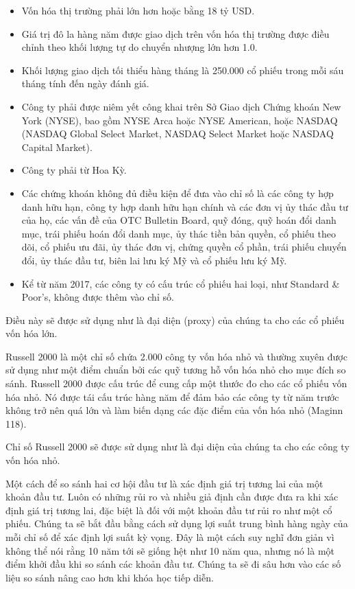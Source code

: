\begin{itemize}
  \item Vốn hóa thị trường phải lớn hơn hoặc bằng 18 tỷ USD.
  \item Giá trị đô la hàng năm được giao dịch trên vốn hóa thị trường được điều chỉnh theo khối lượng tự do chuyển nhượng lớn hơn 1.0.
  \item Khối lượng giao dịch tối thiểu hàng tháng là 250.000 cổ phiếu trong mỗi sáu tháng tính đến ngày đánh giá.
  \item Công ty phải được niêm yết công khai trên Sở Giao dịch Chứng khoán New York (NYSE), bao gồm NYSE Arca hoặc NYSE American, hoặc NASDAQ (NASDAQ Global Select Market, NASDAQ Select Market hoặc NASDAQ Capital Market).
  \item Công ty phải từ Hoa Kỳ.
  \item Các chứng khoán không đủ điều kiện để đưa vào chỉ số là các công ty hợp danh hữu hạn, công ty hợp danh hữu hạn chính và các đơn vị ủy thác đầu tư của họ, các vấn đề của OTC Bulletin Board, quỹ đóng, quỹ hoán đổi danh mục, trái phiếu hoán đổi danh mục, ủy thác tiền bản quyền, cổ phiếu theo dõi, cổ phiếu ưu đãi, ủy thác đơn vị, chứng quyền cổ phần, trái phiếu chuyển đổi, ủy thác đầu tư, biên lai lưu ký Mỹ và cổ phiếu lưu ký Mỹ.
  \item Kể từ năm 2017, các công ty có cấu trúc cổ phiếu hai loại, như Standard \& Poor's, không được thêm vào chỉ số.
\end{itemize}
Điều này sẽ được sử dụng như là đại diện (proxy) của chúng ta cho các cổ phiếu vốn hóa lớn.

Russell 2000 là một chỉ số chứa 2.000 công ty vốn hóa nhỏ và thường xuyên được sử dụng như một điểm chuẩn bởi các quỹ tương hỗ vốn hóa nhỏ cho mục đích so sánh. Russell 2000 được cấu trúc để cung cấp một thước đo cho các cổ phiếu vốn hóa nhỏ. Nó được tái cấu trúc hàng năm để đảm bảo các công ty từ năm trước không trở nên quá lớn và làm biến dạng các đặc điểm của vốn hóa nhỏ (Maginn 118).

Chỉ số Russell 2000 sẽ được sử dụng như là đại diện của chúng ta cho các công ty vốn hóa nhỏ.

Một cách để so sánh hai cơ hội đầu tư là xác định giá trị tương lai của một khoản đầu tư. Luôn có những rủi ro và nhiều giả định cần được đưa ra khi xác định giá trị tương lai, đặc biệt là đối với một khoản đầu tư rủi ro như một cổ phiếu. Chúng ta sẽ bắt đầu bằng cách sử dụng lợi suất trung bình hàng ngày của mỗi chỉ số để xác định lợi suất kỳ vọng. Đây là một cách suy nghĩ đơn giản vì không thể nói rằng 10 năm tới sẽ giống hệt như 10 năm qua, nhưng nó là một điểm khởi đầu khi so sánh các khoản đầu tư. Chúng ta sẽ đi sâu hơn vào các số liệu so sánh nâng cao hơn khi khóa học tiếp diễn.


